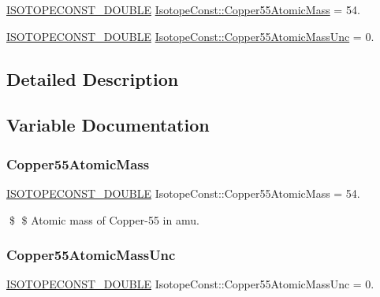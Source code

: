 \begin{DoxyCompactItemize}
\item 
\mbox{\hyperlink{group___isotope_const-_macros_ga8f45a7272ce02c0b4c65c44636ed719a}{I\+S\+O\+T\+O\+P\+E\+C\+O\+N\+S\+T\+\_\+\+D\+O\+U\+B\+LE}} \mbox{\hyperlink{group___isotope_const-_copper-_cu55_ga9120b888a147e4d407a694bbd348276c}{Isotope\+Const\+::\+Copper55\+Atomic\+Mass}} = 54.
\item 
\mbox{\hyperlink{group___isotope_const-_macros_ga8f45a7272ce02c0b4c65c44636ed719a}{I\+S\+O\+T\+O\+P\+E\+C\+O\+N\+S\+T\+\_\+\+D\+O\+U\+B\+LE}} \mbox{\hyperlink{group___isotope_const-_copper-_cu55_gaf66412f57f182d445652441f054808f1}{Isotope\+Const\+::\+Copper55\+Atomic\+Mass\+Unc}} = 0.
\end{DoxyCompactItemize}


\subsection{Detailed Description}


\subsection{Variable Documentation}
\mbox{\label{group___isotope_const-_copper-_cu55_ga9120b888a147e4d407a694bbd348276c}} 
\subsubsection{\texorpdfstring{Copper55\+Atomic\+Mass}{Copper55AtomicMass}}
{\footnotesize\ttfamily \mbox{\hyperlink{group___isotope_const-_macros_ga8f45a7272ce02c0b4c65c44636ed719a}{I\+S\+O\+T\+O\+P\+E\+C\+O\+N\+S\+T\+\_\+\+D\+O\+U\+B\+LE}} Isotope\+Const\+::\+Copper55\+Atomic\+Mass = 54.}

\$ \$ Atomic mass of Copper-\/55 in amu. \mbox{\label{group___isotope_const-_copper-_cu55_gaf66412f57f182d445652441f054808f1}} 
\subsubsection{\texorpdfstring{Copper55\+Atomic\+Mass\+Unc}{Copper55AtomicMassUnc}}
{\footnotesize\ttfamily \mbox{\hyperlink{group___isotope_const-_macros_ga8f45a7272ce02c0b4c65c44636ed719a}{I\+S\+O\+T\+O\+P\+E\+C\+O\+N\+S\+T\+\_\+\+D\+O\+U\+B\+LE}} Isotope\+Const\+::\+Copper55\+Atomic\+Mass\+Unc = 0.}

